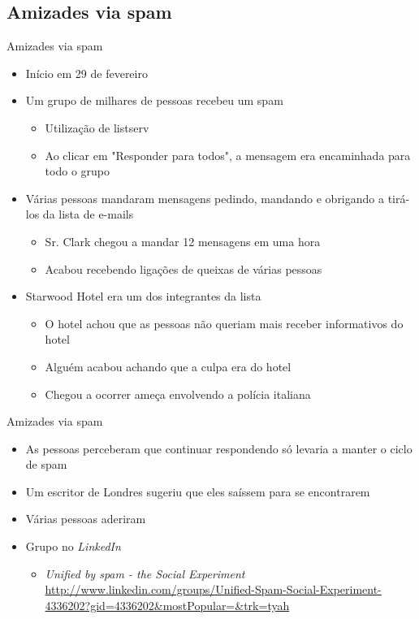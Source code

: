 \documentclass[dvipdfm]{beamer}
\begin{document}
\subsection{Amizades via spam}
\begin{frame}{Amizades via spam}
	\begin{itemize}
		\item Início em 29 de fevereiro
		\item Um grupo de milhares de pessoas recebeu um spam
		\begin{itemize}
			\item Utilização de listserv
			\item Ao clicar em "Responder para todos", a mensagem era encaminhada para todo o grupo
		\end{itemize}
		\item Várias pessoas mandaram mensagens pedindo, mandando e obrigando a tirá-los da lista de e-mails
		\begin{itemize}
			\item Sr. Clark chegou a mandar 12 mensagens em uma hora
			\item Acabou recebendo ligações de queixas de várias pessoas
		\end{itemize}
		\item Starwood Hotel era um dos integrantes da lista
		\begin{itemize}
			\item O hotel achou que as pessoas não queriam mais receber informativos do hotel
			\item Alguém acabou achando que a culpa era do hotel
			\item Chegou a ocorrer ameça envolvendo a polícia italiana
		\end{itemize}
	\end{itemize}
\end{frame}

\begin{frame}{Amizades via spam}
	\begin{itemize}
		\item As pessoas perceberam que continuar respondendo só levaria a manter o ciclo de spam
		\item Um escritor de Londres sugeriu que eles saíssem para se encontrarem
		\item Várias pessoas aderiram
		\item Grupo no \emph{LinkedIn}
		\begin{itemize}
			\item \emph{Unified by spam - the Social Experiment}
			\url{http://www.linkedin.com/groups/Unified-Spam-Social-Experiment-4336202?gid=4336202\&mostPopular=\&trk=tyah}
		\end{itemize}
	\end{itemize}
\end{frame}
\end{document}

